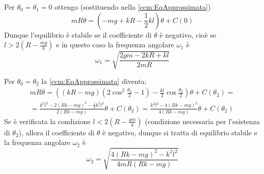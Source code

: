 \documentclass[../main.tex]{subfiles}
\begin{document}
Per $\theta_0 = \theta_1 = 0$ ottengo (sostituendo nella \cref{ccm:EqApprossimata})
\begin{equation*}
	mR\ddot\theta = \left ( -mg + kR -\frac{1}{2}kl\right )\theta + C(0)
\end{equation*}
Dunque l'equilibrio è stabile se il coefficiente di $\theta$ è negativo, cioè se $l> 2\left ( R - \frac{mg}{k} \right )$ e in questo caso la frequenza angolare $\omega_1$ è $$\omega_1 = \sqrt{\frac{2gm-2kR+kl}{2mR}}$$

Per $\theta_0=\theta_2$ la \cref{ccm:EqApprossimata} diventa:
\begin{equation*}\begin{split}
	mR\ddot\theta = \left (  \left ( kR-mg\right ) \left ( 2\cos^2\frac{\theta_2}{2}-1\right ) - \frac{kl}{2}\cos\frac{\theta_2}{2}\right ) \theta  + C(\theta_2) =\\
	= \frac {k^2 l^2 - 2\left (Rk-mg\right ) ^2-\frac{1}{2}k^2 l^2}{2\left ( Rk - mg\right )}\theta + C(\theta_2) = \frac{k^2 l^2 - 4 \left ( Rk - mg\right )^2}{4\left (Rk-mg\right )} \theta + C(\theta_2)
\end{split}\end{equation*}
Se è verificata la condizione  $l<2\left ( R - \frac{gm}{k}\right )$ (condizione necessaria per l'esistenza di $\theta_2$), allora il coefficiente di $\theta$ è negativo, dunque si tratta di equilibrio stabile e la frequenza angolare $\omega_2$ è 
$$ \omega_2 = \sqrt {\frac{4\left ( Rk-mg\right )^2-k^2 l^2 }{4mR\left (Rk-mg\right )}} $$

\end{document}
